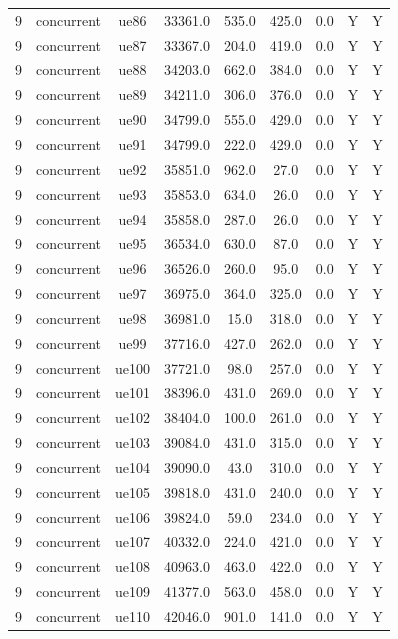 \begin{table}[ht]
\begin{tabular}{|c|c|c|c|c|c|c|c|c|}
9 & concurrent & ue86 & 33361.0 & 535.0 & 425.0 & 0.0 & Y & Y \\
9 & concurrent & ue87 & 33367.0 & 204.0 & 419.0 & 0.0 & Y & Y \\
9 & concurrent & ue88 & 34203.0 & 662.0 & 384.0 & 0.0 & Y & Y \\
9 & concurrent & ue89 & 34211.0 & 306.0 & 376.0 & 0.0 & Y & Y \\
9 & concurrent & ue90 & 34799.0 & 555.0 & 429.0 & 0.0 & Y & Y \\
9 & concurrent & ue91 & 34799.0 & 222.0 & 429.0 & 0.0 & Y & Y \\
9 & concurrent & ue92 & 35851.0 & 962.0 & 27.0 & 0.0 & Y & Y \\
9 & concurrent & ue93 & 35853.0 & 634.0 & 26.0 & 0.0 & Y & Y \\
9 & concurrent & ue94 & 35858.0 & 287.0 & 26.0 & 0.0 & Y & Y \\
9 & concurrent & ue95 & 36534.0 & 630.0 & 87.0 & 0.0 & Y & Y \\
9 & concurrent & ue96 & 36526.0 & 260.0 & 95.0 & 0.0 & Y & Y \\
9 & concurrent & ue97 & 36975.0 & 364.0 & 325.0 & 0.0 & Y & Y \\
9 & concurrent & ue98 & 36981.0 & 15.0 & 318.0 & 0.0 & Y & Y \\
9 & concurrent & ue99 & 37716.0 & 427.0 & 262.0 & 0.0 & Y & Y \\
9 & concurrent & ue100 & 37721.0 & 98.0 & 257.0 & 0.0 & Y & Y \\
9 & concurrent & ue101 & 38396.0 & 431.0 & 269.0 & 0.0 & Y & Y \\
9 & concurrent & ue102 & 38404.0 & 100.0 & 261.0 & 0.0 & Y & Y \\
9 & concurrent & ue103 & 39084.0 & 431.0 & 315.0 & 0.0 & Y & Y \\
9 & concurrent & ue104 & 39090.0 & 43.0 & 310.0 & 0.0 & Y & Y \\
9 & concurrent & ue105 & 39818.0 & 431.0 & 240.0 & 0.0 & Y & Y \\
9 & concurrent & ue106 & 39824.0 & 59.0 & 234.0 & 0.0 & Y & Y \\
9 & concurrent & ue107 & 40332.0 & 224.0 & 421.0 & 0.0 & Y & Y \\
9 & concurrent & ue108 & 40963.0 & 463.0 & 422.0 & 0.0 & Y & Y \\
9 & concurrent & ue109 & 41377.0 & 563.0 & 458.0 & 0.0 & Y & Y \\
9 & concurrent & ue110 & 42046.0 & 901.0 & 141.0 & 0.0 & Y & Y \\

\end{tabular}
\end{table}
